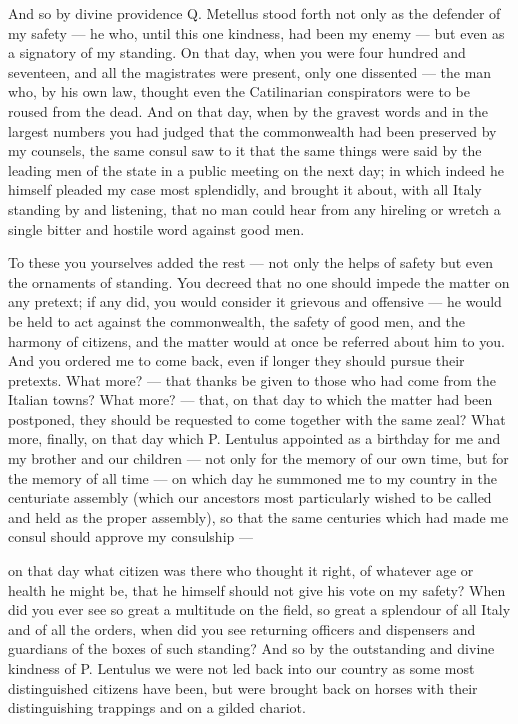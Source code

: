  And so by divine providence Q. Metellus stood forth not only as the defender of my safety --- he who, until this one kindness, had been my enemy --- but even as a signatory of my standing. On that day, when you were four hundred and seventeen, and all the magistrates were present, only one dissented --- the man who, by his own law, thought even the Catilinarian conspirators were to be roused from the dead. And on that day, when by the gravest words and in the largest numbers you had judged that the commonwealth had been preserved by my counsels, the same consul saw to it that the same things were said by the leading men of the state in a public meeting on the next day; in which indeed he himself pleaded my case most splendidly, and brought it about, with all Italy standing by and listening, that no man could hear from any hireling or wretch a single bitter and hostile word against good men.

 To these you yourselves added the rest --- not only the helps of safety but even the ornaments of standing. You decreed that no one should impede the matter on any pretext; if any did, you would consider it grievous and offensive --- he would be held to act against the commonwealth, the safety of good men, and the harmony of citizens, and the matter would at once be referred about him to you. And you ordered me to come back, even if longer they should pursue their pretexts. What more? --- that thanks be given to those who had come from the Italian towns? What more? --- that, on that day to which the matter had been postponed, they should be requested to come together with the same zeal? What more, finally, on that day which P. Lentulus appointed as a birthday for me and my brother and our children --- not only for the memory of our own time, but for the memory of all time --- on which day he summoned me to my country in the centuriate assembly (which our ancestors most particularly wished to be called and held as the proper assembly), so that the same centuries which had made me consul should approve my consulship ---

 on that day what citizen was there who thought it right, of whatever age or health he might be, that he himself should not give his vote on my safety? When did you ever see so great a multitude on the field, so great a splendour of all Italy and of all the orders, when did you see returning officers and dispensers and guardians of the boxes of such standing? And so by the outstanding and divine kindness of P. Lentulus we were not led back into our country as some most distinguished citizens have been, but were brought back on horses with their distinguishing trappings and on a gilded chariot.

